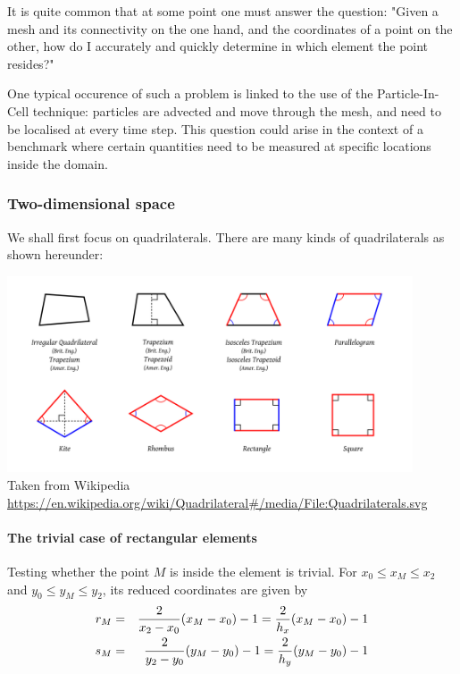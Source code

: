 
It is quite common that at some point one must answer the question:
"Given a mesh and its connectivity on the one hand, and the coordinates of a 
point on the other, how do I accurately and quickly determine in which element 
the point resides?"

One typical occurence of such a problem is linked to the use of the Particle-In-Cell 
technique: particles are advected and move through the mesh, and need to be localised 
at every time step. This question could arise in the context of a benchmark where 
certain quantities need to be measured at specific locations inside the domain. 

\subsubsection{Two-dimensional space}

We shall first focus on quadrilaterals. There are many kinds of quadrilaterals as shown 
hereunder: 

\begin{center}
\includegraphics[width=12cm]{images/quadrilaterals} \\
{\captionfont Taken from Wikipedia 
\url{https://en.wikipedia.org/wiki/Quadrilateral#/media/File:Quadrilaterals.svg}}
\end{center}

\paragraph{The trivial case of rectangular elements} 

Testing whether the point $M$ is inside the element is trivial. 
For $x_0 \leq x_M \leq x_2$ and $y_0 \leq y_M \leq y_2$, its reduced coordinates
are given by
\begin{eqnarray}
r_M &=& \frac{2}{x_2-x_0}(x_M-x_0) -1 = \frac{2}{h_x}(x_M-x_0)-1  \nonumber\\
s_M &=& \frac{2}{y_2-y_0}(y_M-y_0) -1 = \frac{2}{h_y}(y_M-y_0)-1  
\end{eqnarray}

